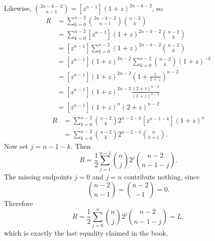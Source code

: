 Likewise, $\binom{2n - k - 2}{n - 1} = [z^{n - 1}] (1 + z)^{2n - k - 2}$, so
\begin{equation*}
    \begin{aligned}
        R
        &= \sum_{k = 0}^{n - 2} \binom{2n - k - 2}{n - 1} \binom{n - 2}{k} \\
        &= \sum_{k = 0}^{n - 2} [z^{n - 1}] (1 + z)^{2n - k - 2} \binom{n - 2}{k} \\
        &= [z^{n - 1}] \sum_{k = 0}^{n - 2}(1 + z)^{2n - k - 2} \binom{n - 2}{k} \\
        &= [z^{n - 1}] (1 + z)^{2n - 2} \sum_{k = 0}^{n - 2} \binom{n - 2}{k}(1 + z)^{-k} \\
        &= [z^{n - 1}] (1 + z)^{2n - 2}\left(1 + \frac{1}{1 + z} \right)^{n - 2} \\
        &= [z^{n - 1}] (1 + z)^{2n - 2} \frac{(2 + z)^{n - 2}}{(1 + z)^{n - 2}} \\
        &= [z^{n - 1}] (1 + z)^{n}(2 + z)^{n - 2}
    \end{aligned}
\end{equation*}
\begin{equation*}
    \begin{aligned}
        R
        &= \sum_{k = 0}^{n - 2} \binom{n - 2}{k} 2^{n - 2 - k} [z^{n - 1 - k}] (1 + z)^{n} \\
        &= \sum_{k = 0}^{n - 2} \binom{n - 2}{k} 2^{n - 2 - k} \binom{n}{k + 1}.
    \end{aligned}
\end{equation*}
Now set $j = n - 1 - k$. Then
\begin{equation*}
    R = \frac{1}{2} \sum_{j = 1}^{n - 1} \binom{n}{j} 2^{j} \binom{n - 2}{n - 1 - j}.
\end{equation*}
The missing endpoints $j = 0$ and $j = n$ contribute nothing, since
\[
    \binom{n - 2}{n - 1} = \binom{n - 2}{-1} = 0.
\]
Therefore
\begin{equation*}
    R = \frac{1}{2} \sum_{j = 0}^{n} \binom{n}{j} 2^{j} \binom{n - 2}{n - 1 - j} = L,
\end{equation*}
which is exactly the last equality claimed in the book.

